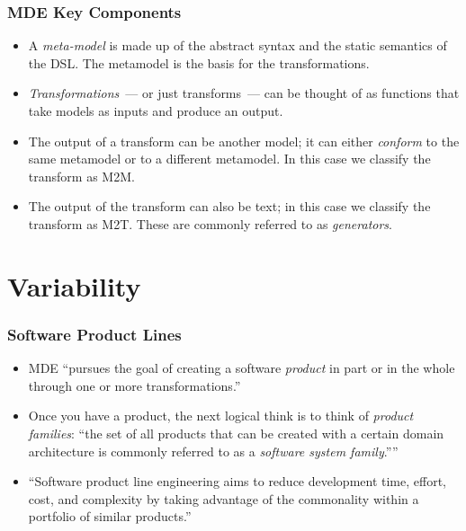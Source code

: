 \documentclass{beamer}
\begin{document}
\begin{frame}
\frametitle{\ac{MDE} Key Components}

\begin{itemize}

\item A \emph{meta-model} is made up of the abstract syntax and the
  static semantics of the \ac{DSL}. The metamodel is the basis for the
  transformations.

\pause

\item \emph{Transformations}~--- or just transforms~--- can be thought
  of as functions that take models as inputs and produce an output.

\pause

\item The output of a transform can be another model; it can either
  \emph{conform} to the same metamodel or to a different metamodel. In
  this case we classify the transform as \ac{M2M}.

\pause

\item The output of the transform can also be text; in this case we
  classify the transform as \ac{M2T}. These are commonly referred to
  as \emph{generators}.

\end{itemize}

\end{frame}

\section{Variability}

\begin{frame}
\frametitle{Software Product Lines}

\begin{itemize}

\item \ac{MDE} ``pursues the goal of creating a software
  \emph{product} in part or in the whole through one or more
  transformations.''\cite{volter2013model}

\pause

\item Once you have a product, the next logical think is to think of
  \emph{product families}: ``the set of all products that can be
  created with a certain domain architecture is commonly referred to
  as a \emph{software system family}.''''\cite{volter2013model}

\pause

\item ``Software product line engineering aims to reduce development
  time, effort, cost, and complexity by taking advantage of the
  commonality within a portfolio of similar
  products.''\cite{voelter2007handling}

\end{itemize}

\end{frame}
\end{document}
